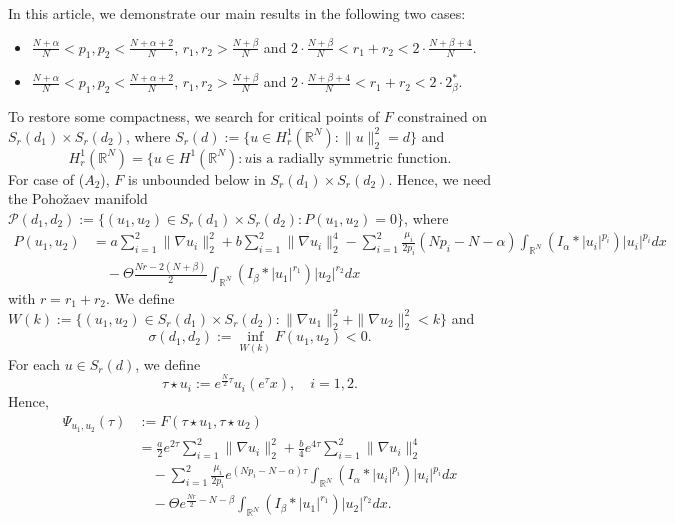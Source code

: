 \documentclass[reqno]{amsart}
\begin{document}
In this article, we demonstrate our main results in the following two cases:
\begin{itemize}
\item[(A1)] $\frac{N+\alpha}{N}<p_1,p_2<\frac{N+\alpha+2}{N}$,
$r_1,r_2>\frac{N+\beta}{N}$ and
$2\cdot\frac{N+\beta}{N}<r_1+r_2<2\cdot\frac{N+\beta+4}{N}$.

\item[(A2)]  $\frac{N+\alpha}{N}<p_1,p_2<\frac{N+\alpha+2}{N}$,
$r_1,r_2>\frac{N+\beta}{N}$ and $2\cdot\frac{N+\beta+4}{N}<r_1+r_2<2\cdot2_\beta^*$.
\end{itemize}
To restore some compactness, we search for critical points of $F$ constrained on
$S_r(d_1)\times S_r(d_2)$,
where $S_r(d):=\{u\in H_r^1(\mathbb{R}^N):\| u\|_2^2=d\}$ and
\[
H_r^1(\mathbb{R}^N)=\{u\in H^1(\mathbb{R}^N):
 u \text{is a radially symmetric function}.
\] 
For case of ($A_2$), $F$ is unbounded below in $S_r(d_1)\times S_r(d_2)$.
Hence, we need the Poho\v{z}aev manifold
$\mathcal{P}(d_1,d_2):=\{(u_1,u_2)\in S_r(d_1)\times S_r(d_2): P(u_1,u_2)=0\}$, where
\begin{align*}
P(u_1,u_2)
&=a\sum_{i=1}^2\| \nabla u_i\|_2^2+b\sum_{i=1}^2\| \nabla u_i\|_2^4
-\sum_{i=1}^2\frac{\mu_i}{2p_i}(Np_i-N-\alpha)
 \int_{\mathbb{R}^N}(I_\alpha\ast|u_i|^{p_i})|u_i|^{p_i}dx\\
&\quad-\Theta\frac{Nr-2(N+\beta)}{2}\int_{\mathbb{R}^N}(I_\beta\ast|u_1|^{r_1})
|u_2|^{r_2}dx
\end{align*}
with $r=r_1+r_2$. We define $W(k):=\{(u_1,u_2)\in S_r(d_1)\times
S_r(d_2):\| \nabla u_1\|_2^2+\| \nabla u_2\|_2^2<k\}$
and
\begin{equation}\label{jxh25}
 \sigma(d_1,d_2):=\inf_{W(k)}F(u_1,u_2)<0.
\end{equation}
For each $u\in S_r(d)$, we define
\[
 \tau\star u_i:=e^{\frac{N}{2}\tau}u_i(e^{\tau}x), \quad i=1,2.
\]
Hence,
\begin{equation}
\begin{aligned}
\Psi_{u_1,u_2}(\tau)
&:=F(\tau\star u_1,\tau\star u_2)\\
&=\frac{a}{2}e^{2\tau}\sum_{i=1}^2\|\nabla u_i\|_2^2
 +\frac{b}{4}e^{4\tau}\sum_{i=1}^2\|\nabla u_i\|_2^4\\
&\quad-\sum_{i=1}^2\frac{\mu_i}{2p_i}e^{(Np_i-N-\alpha)\tau}
 \int_{\mathbb{R}^N}(I_\alpha\ast|u_i|^{p_i})|u_i|^{p_i}dx\\
&\quad -\Theta e^{\frac{Nr}{2}-N-\beta}
 \int_{\mathbb{R}^N}(I_\beta\ast|u_1|^{r_1})|u_2|^{r_2}dx.
\end{aligned}
\end{equation}
\end{document}
